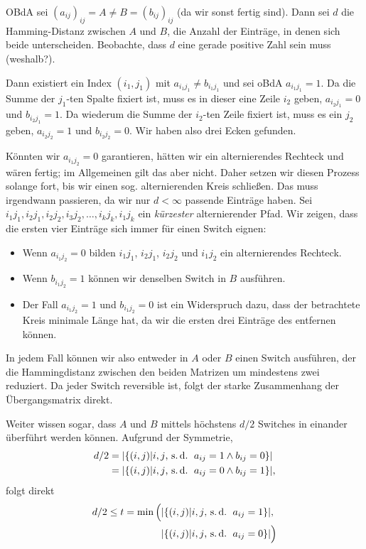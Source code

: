 \begin{theorem}
    OBdA sei $(a_{ij})_{ij} = A \ne B = (b_{ij})_{ij}$ (da wir sonst fertig sind).
    Dann sei $d$ die Hamming-Distanz zwischen $A$ und $B$, \dh die Anzahl der Einträge, in denen sich beide unterscheiden.
    Beobachte, dass $d$ eine gerade positive Zahl sein muss (weshalb?).

    Dann existiert ein Index $(i_1, j_1)$ mit $a_{i_1j_1} \ne b_{i_1j_1}$ und sei oBdA $a_{i_1j_1} = 1$.
    Da die Summe der $j_1$-ten Spalte fixiert ist, muss es in dieser eine Zeile $i_2$ geben, \sd $a_{i_2j_1} = 0$ und $b_{i_2j_1} = 1$.
    Da wiederum die Summe der $i_2$-ten Zeile fixiert ist, muss es ein $j_2$ geben, \sd $a_{i_2j_2} = 1$ und $b_{i_2j_2} = 0$.
    Wir haben also drei Ecken gefunden.

    Könnten wir $a_{i_1j_2} = 0$ garantieren, hätten wir ein alternierendes Rechteck und wären fertig;
    im Allgemeinen gilt das aber nicht.
    Daher setzen wir diesen Prozess solange fort, bis wir einen sog. alternierenden Kreis schließen.
    Das muss irgendwann passieren, da wir nur $d < \infty$ passende Einträge haben.
    Sei $i_1j_1, i_2j_1, i_2j_2, i_3j_2, \ldots, i_kj_k, i_1j_k$ ein \emph{kürzester} alternierender Pfad.
    Wir zeigen, dass die ersten vier Einträge sich immer für einen Switch eignen:
    \begin{itemize}
        \item Wenn $a_{i_1j_2} = 0$ bilden $i_1j_1$, $i_2j_1$, $i_2j_2$ und $i_1j_2$ ein alternierendes Rechteck.
        \item Wenn $b_{i_1j_2} = 1$ können wir denselben Switch in $B$ ausführen.
        \item Der Fall $a_{i_1j_2} = 1$ und $b_{i_1j_2} = 0$ ist ein Widerspruch dazu, dass der betrachtete Kreis minimale Länge hat, da wir die ersten drei Einträge des entfernen können.
    \end{itemize}

    In jedem Fall können wir also entweder in $A$ oder $B$ einen Switch ausführen, der die Hammingdistanz zwischen den beiden Matrizen um mindestens zwei reduziert.
    Da jeder Switch reversible ist, folgt der starke Zusammenhang der Übergangsmatrix direkt.

    Weiter wissen sogar, dass $A$ und $B$ mittels höchstens $d/2$ Switches in einander überführt werden können.
    Aufgrund der Symmetrie,
    \begin{align}
        d/2 & = \card{\set{ (i, j) \middle| i, j \text{, \sd\,} a_{ij} = 1 \land b_{ij} = 0}}  \\
            & = \card{\set{ (i, j) \middle| i, j \text{, \sd\,} a_{ij} = 0 \land b_{ij} = 1}},
    \end{align}
    folgt direkt
    \begin{align}
        d/2 \le t =  \min\Big(
         & \card{\set{ (i, j) \middle| i, j \text{, \sd\,} a_{ij} = 1}},       \\
         & \card{\set{ (i, j) \middle| i, j \text{, \sd\,} a_{ij} = 0}}  \Big)
    \end{align}
\end{theorem}

